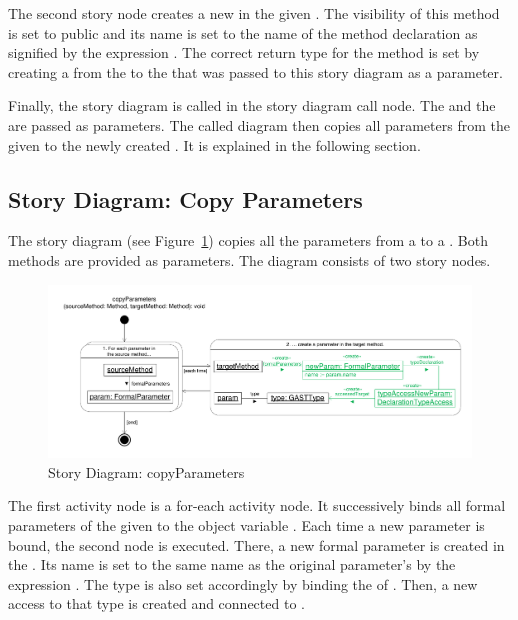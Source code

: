 The second story node creates a new  in the given . The visibility of this method is set to public and its name is set to the name of the method declaration as signified by the expression . The correct return type for the method is set by creating a  from the  to the  that was passed to this story diagram as a parameter.

Finally, the story diagram  is called in the story diagram call node. The  and the  are passed as parameters. The called diagram then copies all parameters from the given  to the newly created . It is explained in the following section.

\subsection{Story Diagram: Copy Parameters} \label{sec:SDCopyParameters}

The story diagram  (see Figure~\ref{fig:SDCopyParameters}) copies all the parameters from a  to a . Both methods are provided as parameters. The diagram consists of two story nodes.

\begin{figure}[hbtp]
\centering
\includegraphics[width=0.9\linewidth]{./figures/SDCopyParameters}
\caption{Story Diagram: copyParameters}
\label{fig:SDCopyParameters}
\end{figure}

The first activity node is a for-each activity node. It successively binds all formal parameters of the given  to the object variable . Each time a new parameter is bound, the second node is executed. There, a new formal parameter  is created in the . Its name is set to the same name as the original parameter's by the expression . The type is also set accordingly by binding the  of . Then, a new access to that type is created and connected to .